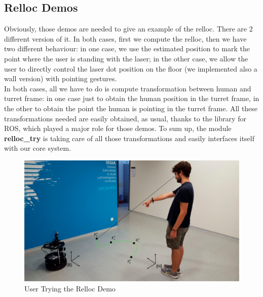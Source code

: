 \subsection{Relloc Demos}
Obviously, those demos are needed to give an example of the relloc. There are 2 different version of it. In both cases, first we compute the relloc, then we have two different behaviour: in one case, we use the estimated position to mark the point where the user is standing with the laser; in the other case, we allow the user to directly control the laser dot position on the floor (we implemented also a wall version) with pointing gestures.\\
In both cases, all we have to do is compute transformation between human and turret frame: in one case just to obtain the human position in the turret frame, in the other to obtain the point the human is pointing in the turret frame. All these transformations needed are easily obtained, as usual, thanks to the  library for ROS, which played a major role for those demos. To sum up, the module \textbf{relloc\_try} is taking care of all those transformations and easily interfaces itself with our core system.
\begin{figure}
	\centering
	\includegraphics[width=\textwidth]{img/rellocDemo.png}%
	\caption{User Trying the Relloc Demo}
	\label{fig:rellocDemo}
\end{figure}
